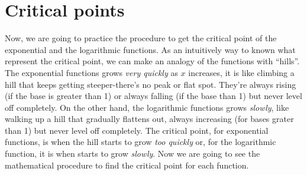 \documentclass[../main.tex]{subfiles}
\begin{document}
\section{Critical points}

Now, we are going to practice the procedure to get the critical point of the exponential and the logarithmic functions.
As an intuitively way to known what represent the critical point, we can make an analogy of the functions with ``hills''.
The exponential functions grows \textit{very quickly} as $x$ increases, it is like climbing a hill that keeps getting steeper-there's no peak or flat spot.
They're always rising (if the base is greater than 1) or always falling (if the base than 1) but never level off completely.
On the other hand, the logarithmic functions grows \textit{slowly}, like walking up a hill that gradually flattens out, always increasing (for bases grater than 1) but never level off completely.
The critical point, for exponential functions, is when the hill starts to grow \textit{too quickly} or, for the logarithmic function, it is when starts to grow \textit{slowly}.
Now we are going to see the mathematical procedure to find the critical point for each function.
\end{document}
